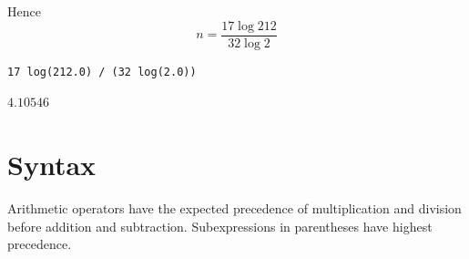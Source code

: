 \documentclass[12pt]{article}
\begin{document}
Hence
\begin{equation*}
n=\frac{17 \log212}{32\log2}
\end{equation*}

{\color{blue}
\begin{verbatim}
17 log(212.0) / (32 log(2.0))
\end{verbatim}}

$4.10546$

\newpage

\section{Syntax}

Arithmetic operators have the expected precedence of
multiplication and division before addition and subtraction.
Subexpressions in parentheses have highest precedence.
\end{document}
